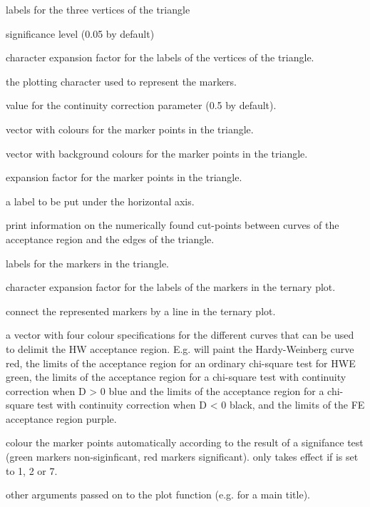 \documentclass[a4paper]{article}
\begin{document}
\begin{Arguments}
\begin{ldescription}
\item[\code{vertexlab}] labels for the three vertices of the triangle 
\item[\code{alpha}] significance level (0.05 by default) 
\item[\code{vertex.cex}] character expansion factor for the labels of the vertices of the triangle. 
\item[\code{pch}] the plotting character used to represent the markers. 
\item[\code{cc}] value for the continuity correction parameter (0.5 by default). 
\item[\code{markercol}] vector with colours for the marker points in the triangle. 
\item[\code{markerbgcol}] vector with background colours for the marker points in the triangle. 
\item[\code{cex}] expansion factor for the marker points in the triangle. 
\item[\code{axislab}] a label to be put under the horizontal axis. 
\item[\code{verbose}] print information on the numerically found cut-points between curves of the acceptance region and 
the edges of the triangle. 
\item[\code{markerlab}] labels for the markers in the triangle. 
\item[\code{mcex}] character expansion factor for the labels of the markers in the ternary plot. 
\item[\code{connect}] connect the represented markers by a line in the ternary plot. 
\item[\code{curvecols}] a vector with four colour specifications for the different curves that can be used
to delimit the HW acceptance region. E.g.  will paint
the Hardy-Weinberg curve red, the limits of the acceptance region for an ordinary chi-square test
for HWE green, the limits of the acceptance region for a chi-square test with continuity correction
when D > 0 blue and the limits of the acceptance region for a chi-square test with continuity 
correction when D < 0 black, and the limits of the FE acceptance region purple. 
\item[\code{signifcolour}] colour the marker points automatically according to the result of a signifance test 
(green markers non-siginficant, red markers significant). 
 only takes effect if  is set to 1, 2 or 7.
\item[\code{...}] other arguments passed on to the plot function (e.g.  for a main title). 
\end{ldescription}
\end{Arguments}
\end{document}
